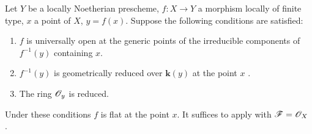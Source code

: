 \begin{corollary}[15.2.3]
\label{IV.15.2.3}
Let $Y$ be a locally Noetherian prescheme, $f:X\to Y$ a morphism locally of finite type, $x$ a point of $X$, $y=f(x)$.
Suppose the following conditions are satisfied:
\begin{enumerate}[label=\textup{(\roman*)}]
  \item $f$ is universally open at the generic points of the irreducible components of $f^{-1}(y)$ containing $x$.
  \item $f^{-1}(y)$ is geometrically reduced over $\boldsymbol{k}(y)$ at the point $x$ .
  \item The ring $\mathscr{O}_y$ is reduced.
\end{enumerate}
Under these conditions $f$ is flat at the point $x$.
It suffices to apply  with $\mathscr{F}=\mathscr{O}_X$ .
\end{corollary}

